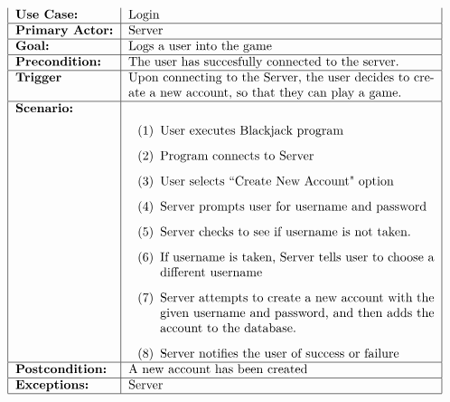 \documentclass[9pt]{article}
\begin{document}
\begin{enumerate}
$$\begin{tabular}{|l|p{0.7\linewidth}|}
            \textbf{Use Case:} & Login \\ \hline
            \textbf{Primary Actor:} & Server \\ \hline
            \textbf{Goal:} & Logs a user into the game \\ \hline
            \textbf{Precondition:} & The user has succesfully connected to the
            server. \\ \hline
            \textbf{Trigger} & Upon connecting to the Server, the user decides
            to create a new account, so that they can play a game. \\ \hline
            \textbf{Scenario:} &
            \begin{enumerate}[label=(\arabic*)]
               \item User executes Blackjack program
               \item Program connects to Server
               \item User selects ``Create New Account" option
               \item Server prompts user for username and password
               \item Server checks to see if username is not taken.
               \item If username is taken, Server tells user to choose a 
                     different username
               \item Server attempts to create a new account with the given
                     username and password, and then adds the account to the
                     database.
               \item Server notifies the user of success or failure
            \end{enumerate} \\ \hline
            \textbf{Postcondition:} & A new account has been created \\ \hline
            \textbf{Exceptions:} & Server \\ \hline
         \end{tabular} 
         $$
\end{enumerate}
\end{document}
